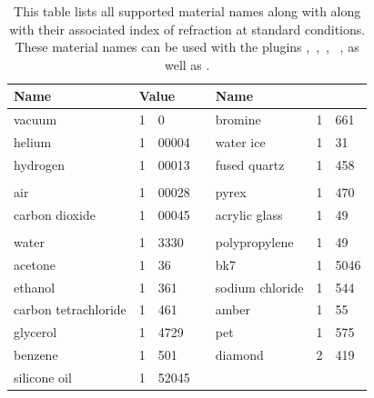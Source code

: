 \begin{table}[h!]
    \centering
    \begin{tabular}{>{\ttfamily}p{5cm}r@{.}lp{.8cm}>{\ttfamily}p{5cm}r@{.}l}
        \toprule
        \rmfamily \textbf{Name} & \multicolumn{2}{l}{\textbf{Value}}& &
        \rmfamily \textbf{Name} & \multicolumn{2}{l}{\textbf{Value}}\\
        \cmidrule{1-3} \cmidrule{5-7}
        vacuum               & 1 & 0 &  &
        bromine              & 1 & 661\\
        helium               & 1 & 00004 & &
        water ice            & 1 & 31\\
        hydrogen             & 1 & 00013& &
        fused quartz         & 1 & 458\\[-.8mm]
        \cmidrule{5-7}\\[-5.5mm]
        air                  & 1 & 00028& &
        pyrex                & 1 & 470\\
        carbon dioxide       & 1 & 00045& &
        acrylic glass        & 1 & 49\\[-.8mm]
        \cmidrule{1-3}\\[-5.5mm]
        water                & 1 & 3330& &
        polypropylene        & 1 & 49\\
        acetone              & 1 & 36 & &
        bk7                  & 1 & 5046\\
        ethanol              & 1 & 361& &
        sodium chloride      & 1 & 544\\
        carbon tetrachloride & 1 & 461& &
        amber                & 1 & 55\\
        glycerol             & 1 & 4729& &
        pet                  & 1 & 575\\
        benzene              & 1 & 501& &
        diamond              & 2 & 419\\
        silicone oil         & 1 & 52045\\
        \bottomrule
    \end{tabular}
    \caption{
        \label{tbl:dielectric-iors}
         This table lists all supported material names along with
         along with their associated index of refraction at standard
         conditions. These material names can be used with the plugins
         ,\
         ,\
         , \
         , as well as
         \pluginref{coating}.
    }
\end{table}
